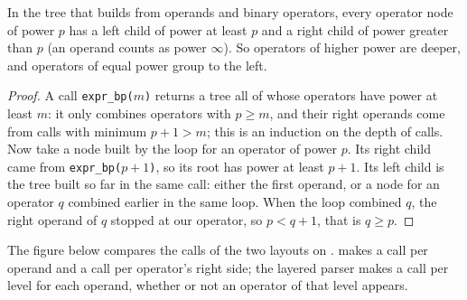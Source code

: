 \begin{theorem}\label{thm:b3:top-down-parsing:climb}
In the tree that  builds from operands and binary operators, every operator node of power $p$ has a left child of power at least $p$ and a right child of power greater than $p$ (an operand counts as power $\infty$). So operators of higher power are deeper, and operators of equal power group to the left.
\end{theorem}

\begin{proof}
A call \texttt{expr\_bp($m$)} returns a tree all of whose operators have power at least $m$: it only combines operators with $p \ge m$, and their right operands come from calls with minimum $p + 1 > m$; this is an induction on the depth of calls. Now take a node built by the loop for an operator of power $p$. Its right child came from \texttt{expr\_bp($p + 1$)}, so its root has power at least $p + 1$. Its left child is the tree built so far in the same call: either the first operand, or a node for an operator $q$ combined earlier in the same loop. When the loop combined $q$, the right operand of $q$ stopped at our operator, so $p < q + 1$, that is $q \ge p$.
\end{proof}

\label{out:b3:top-down-parsing:prec}

The figure below compares the calls of the two layouts on .  makes a call per operand and a call per operator's right side; the layered parser makes a call per level for each operand, whether or not an operator of that level appears.

